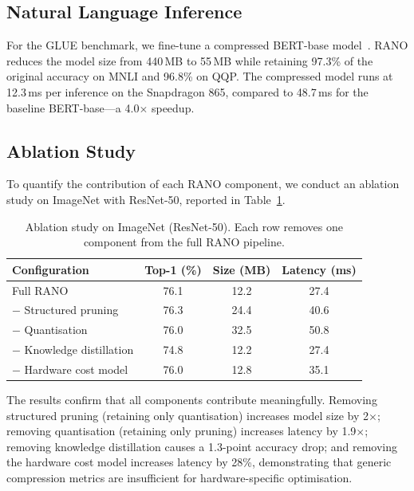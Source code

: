 \subsection{Natural Language Inference}

For the GLUE benchmark, we fine-tune a compressed BERT-base
model~\cite{devlin2019bert}. RANO reduces the model size from 440\,MB to
55\,MB while retaining 97.3\% of the original accuracy on MNLI and
96.8\% on QQP. The compressed model runs at 12.3\,ms per inference on
the Snapdragon 865, compared to 48.7\,ms for the baseline
BERT-base---a 4.0$\times$ speedup.

\subsection{Ablation Study}

To quantify the contribution of each RANO component, we conduct an
ablation study on ImageNet with ResNet-50, reported in
Table~\ref{tab:ablation}.

\begin{table}[htbp]
\centering
\caption{Ablation study on ImageNet (ResNet-50). Each row removes one
component from the full RANO pipeline.}
\label{tab:ablation}
\begin{tabular}{@{}lccc@{}}
\toprule
\textbf{Configuration} & \textbf{Top-1 (\%)} & \textbf{Size (MB)} & \textbf{Latency (ms)} \\
\midrule
Full RANO                  & 76.1 & 12.2 & 27.4 \\
$-$ Structured pruning     & 76.3 & 24.4 & 40.6 \\
$-$ Quantisation           & 76.0 & 32.5 & 50.8 \\
$-$ Knowledge distillation & 74.8 & 12.2 & 27.4 \\
$-$ Hardware cost model    & 76.0 & 12.8 & 35.1 \\
\bottomrule
\end{tabular}
\end{table}

The results confirm that all components contribute meaningfully.
Removing structured pruning (retaining only quantisation) increases
model size by 2$\times$; removing quantisation (retaining only pruning)
increases latency by 1.9$\times$; removing knowledge distillation causes
a 1.3-point accuracy drop; and removing the hardware cost model
increases latency by 28\%, demonstrating that generic compression
metrics are insufficient for hardware-specific optimisation.

